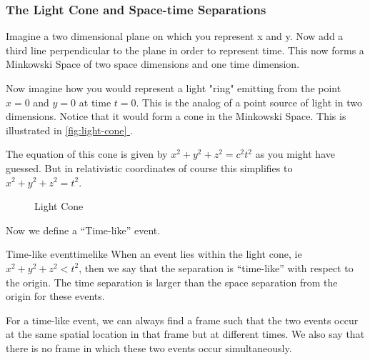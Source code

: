 \documentclass[16pt]{scrartcl}
\newcommand*{\fullref}[1]{\hyperref[{#1}]{\autoref*{#1} \nameref*{#1}}}
\numberwithin{equation}{section}
\theoremstyle{plain}
\theoremstyle{definition}
\begin{document}
\subsubsection*{The Light Cone and Space-time Separations}

Imagine a two dimensional plane on which you represent x and y. Now add a third line perpendicular to the plane in order to represent time. This now forms a Minkowski Space of two space dimensions and one time dimension. 

Now imagine how you would represent a light "ring" emitting from the point $x = 0$ and $y = 0$ at time $t = 0$. This is the analog of a point source of light in two dimensions. Notice that it would form a cone in the Minkowski Space. This is illustrated in \fullref{fig:light-cone}.

The equation of this cone is given by $x^2 + y^2 + z^2 = c^2 t^2$ as you might have guessed. But in relativistic coordinates of course this simplifies to $x^2 + y^2 + z^2 = t^2$.

\begin{figure}
    \centering
    \caption{Light Cone}
    \label{fig:light-cone}
\end{figure}

Now we define a ``Time-like'' event.

\begin{defn}{Time-like event}{timelike}
    When an event lies within the light cone, ie $x^2+y^2+z^2 < t^2$, then we say that the separation is ``time-like'' with respect to the origin. The time separation is larger than the space separation from the origin for these events.
\end{defn}

For a time-like event, we can always find a frame such that the two events occur at the same spatial location in that frame but at different times. We also say that there is no frame in which these two events occur simultaneously.
\end{document}
